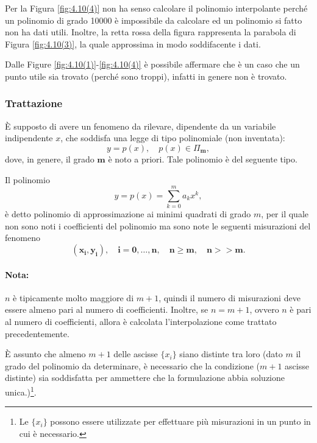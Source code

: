 Per la Figura \ref{fig:4.10(4)} non ha senso calcolare il polinomio interpolante perché un polinomio di grado 10000 è impossibile da calcolare ed un polinomio si fatto non ha dati utili. Inoltre, la retta rossa della figura rappresenta la parabola di Figura \ref{fig:4.10(3)}, la quale approssima in modo soddifacente i dati.

Dalle Figure \ref{fig:4.10(1)}-\ref{fig:4.10(4)} è possibile affermare che è un caso che un punto utile sia trovato (perché sono troppi), infatti in genere non è trovato. 

\subsubsection{Trattazione}
È supposto di avere un fenomeno da rilevare, dipendente da un variabile indipendente $x$, che soddisfa una legge di tipo polinomiale (non inventata):
\begin{equation*}
    y=p(x),\quad p(x)\in\Pi_{\boldsymbol{m}},
\end{equation*}
dove, in genere, il grado $\boldsymbol m$ è noto a priori. Tale polinomio è del seguente tipo.

\begin{definition}
	Il polinomio
	\begin{equation}\label{eq:polinomio_minimi_quadrati}
		y = p(x)=\sum_{k=0}^{m}a_kx^k,
	\end{equation}
	è detto polinomio di approssimazione ai minimi quadrati di grado $m$, per il quale non sono noti i coefficienti del polinomio ma sono note le seguenti misurazioni del fenomeno
	\begin{equation}\label{eq:misurazioni_fenomeno_minimo_quadrato}
		\boldsymbol{(x_i,y_i),\quad i=0,\hdots,n,\quad n\geq m,\quad n}\boldsymbol{>>}\boldsymbol{m}.
	\end{equation}
\end{definition}

\paragraph{Nota:} $n$ è tipicamente molto maggiore di $m+1$, quindi il numero di misurazioni deve essere almeno pari al numero di coefficienti. Inoltre, se $n=m+1$, ovvero $n$ è pari al numero di coefficienti, allora è calcolata l'interpolazione come trattato precedentemente.

\begin{remark}\label{rem:ascisse_distinte_polinomio}
     È assunto che almeno $m+1$ delle ascisse $\{x_i\}$ siano distinte tra loro (dato $m$ il grado del polinomio da determinare, è necessario che la condizione ($m+1$ ascisse distinte) sia soddisfatta per ammettere che la formulazione abbia soluzione unica.)\footnote{Le $\{x_i\}$ possono essere utilizzate per effettuare più misurazioni in un punto in cui è necessario.}.
\end{remark}

